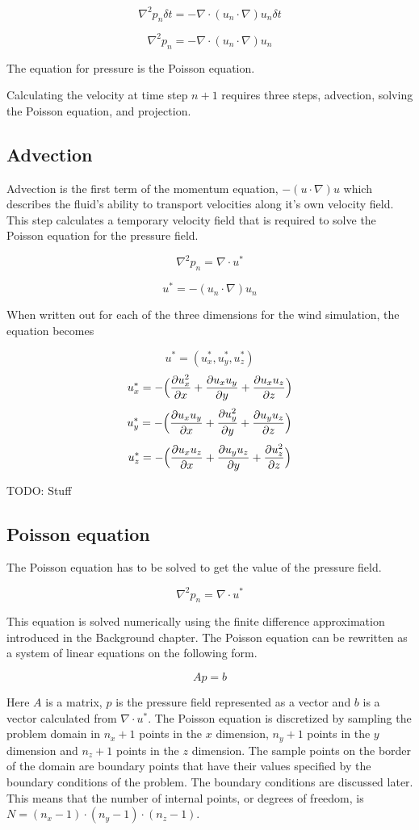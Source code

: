 $$ \nabla^2 p_n \delta t = - \nabla \cdot (u_n \cdot \nabla)u_n \delta t $$

$$ \nabla^2 p_n = - \nabla \cdot (u_n \cdot \nabla)u_n $$

The equation for pressure is the Poisson equation. 

Calculating the velocity at time step $n+1$ requires three steps, advection, 
solving the Poisson equation, and projection.

\subsection{Advection}

Advection is the first term of the momentum equation, $-(u \cdot \nabla)u$ which
describes the fluid's ability to transport velocities along it's own velocity 
field. This step calculates a temporary velocity field that is required to solve
the Poisson equation for the pressure field.

$$ \nabla^2 p_n = \nabla \cdot u^* $$

$$u^* = -(u_n \cdot \nabla)u_n$$

When written out for each of the three dimensions for the wind simulation, the
equation becomes

$$ u^* = (u^*_x, u^*_y, u^*_z) $$
$$ u^*_x = - \Big( \frac{\partial u_x^2}{\partial x} + \frac{\partial u_x u_y}{\partial y} + \frac{\partial u_x u_z}{\partial z}\Big) $$
$$ u^*_y = - \Big( \frac{\partial u_x u_y}{\partial x} + \frac{\partial u_y^2}{\partial y} + \frac{\partial u_y u_z}{\partial z}\Big) $$
$$ u^*_z = - \Big( \frac{\partial u_x u_z}{\partial x} + \frac{\partial u_y u_z}{\partial y} + \frac{\partial u_z^2}{\partial z}\Big) $$

TODO: Stuff

\subsection{Poisson equation}

The Poisson equation has to be solved to get the value of the pressure field. 

$$ \nabla^2 p_n = \nabla \cdot u^* $$

This equation is solved numerically using the finite difference approximation
introduced in the Background chapter. The Poisson equation can be rewritten as 
a system of linear equations on the following form.

$$ Ap = b $$

Here $A$ is a matrix, $p$ is the pressure field represented as a vector and $b$
is a vector calculated from $\nabla \cdot u^*$. The Poisson equation is discretized 
by sampling the problem domain in $n_x+1$ points in the $x$ dimension, $n_y+1$
points in the $y$ dimension and $n_z+1$ points in the $z$ dimension. The sample
points on the border of the domain are boundary points that have their values
specified by the boundary conditions of the problem. The boundary conditions
are discussed later. This means that the number of internal points, or degrees of
freedom, is $N = (n_x-1) \cdot (n_y-1) \cdot (n_z-1)$.

